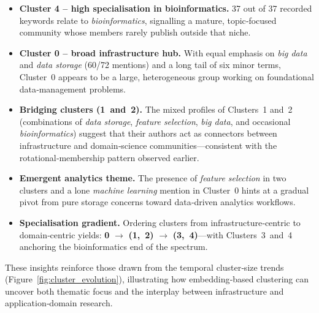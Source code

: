\documentclass[10pt,a4paper]{article}
\begin{document}
\begin{itemize}
    \item \textbf{Cluster 4 – high specialisation in bioinformatics.} 37 out of 37 recorded keywords relate to \emph{bioinformatics}, signalling a mature, topic‑focused community whose members rarely publish outside that niche.

    \item \textbf{Cluster 0 – broad infrastructure hub.} With equal emphasis on \emph{big data} and \emph{data storage} (60/72 mentions) and a long tail of six minor terms, Cluster 0 appears to be a large, heterogeneous group working on foundational data‑management problems.

    \item \textbf{Bridging clusters (1 and 2).} The mixed profiles of Clusters 1 and 2 (combinations of \emph{data storage}, \emph{feature selection}, \emph{big data}, and occasional \emph{bioinformatics}) suggest that their authors act as connectors between infrastructure and domain‑science communities—consistent with the rotational‑membership pattern observed earlier.

    \item \textbf{Emergent analytics theme.} The presence of \emph{feature selection} in two clusters and a lone \emph{machine learning} mention in Cluster 0 hints at a gradual pivot from pure storage concerns toward data‑driven analytics workflows.

    \item \textbf{Specialisation gradient.} Ordering clusters from infrastructure‑centric to domain‑centric yields: \textbf{0} $\rightarrow$ \textbf{(1, 2)} $\rightarrow$ \textbf{(3, 4)}—with Clusters 3 and 4 anchoring the bioinformatics end of the spectrum.
\end{itemize}

These insights reinforce those drawn from the temporal cluster‑size trends (Figure~\ref{fig:cluster_evolution}), illustrating how embedding‑based clustering can uncover both thematic focus and the interplay between infrastructure and application‑domain research.
\end{document}
